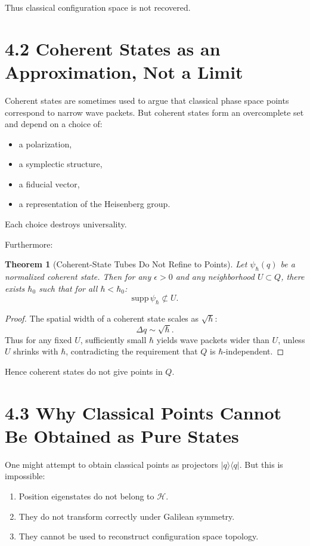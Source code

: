 \documentclass[12pt,oneside]{book}
\theoremstyle{plain}
\newtheorem{theorem}{Theorem}[chapter]
\theoremstyle{definition}
\begin{document}
Thus classical configuration space is not recovered.

\section{4.2 Coherent States as an Approximation, Not a Limit}

Coherent states are sometimes used to argue that classical phase space points correspond to narrow wave packets.  
But coherent states form an overcomplete set and depend on a choice of:

\begin{itemize}
\item a polarization,
\item a symplectic structure,
\item a fiducial vector,
\item a representation of the Heisenberg group.
\end{itemize}

Each choice destroys universality.

Furthermore:

\begin{theorem}[Coherent-State Tubes Do Not Refine to Points]
Let $\psi_\hbar(q)$ be a normalized coherent state.  
Then for any $\epsilon>0$ and any neighborhood $U\subset Q$, there exists $\hbar_0$ such that for all $\hbar<\hbar_0$:
\[
\mathrm{supp}\,\psi_\hbar \not\subset U.
\]
\end{theorem}

\begin{proof}
The spatial width of a coherent state scales as $\sqrt{\hbar}$:
\[
\Delta q \sim \sqrt{\hbar}.
\]
Thus for any fixed $U$, sufficiently small $\hbar$ yields wave packets wider than $U$, unless $U$ shrinks with $\hbar$, contradicting the requirement that $Q$ is $\hbar$-independent.
\end{proof}

Hence coherent states do not give points in $Q$.

\section{4.3 Why Classical Points Cannot Be Obtained as Pure States}

One might attempt to obtain classical points as projectors $\vert q \rangle\!\langle q\vert$.  
But this is impossible:

\begin{enumerate}
\item Position eigenstates do not belong to $\mathcal{H}$.
\item They do not transform correctly under Galilean symmetry.
\item They cannot be used to reconstruct configuration space topology.
\end{enumerate}
\end{document}
